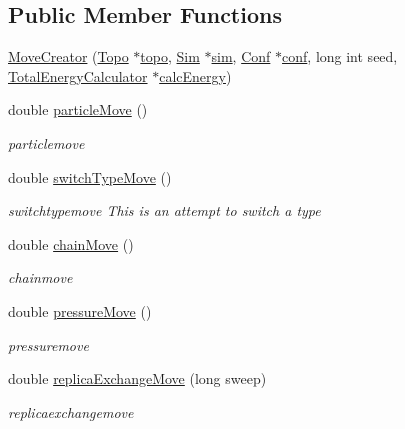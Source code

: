 \subsection*{Public Member Functions}
\begin{DoxyCompactItemize}
\item 
\hyperlink{class_move_creator_aa35bf0832806de7d919a7eed7fb963a5}{Move\+Creator} (\hyperlink{struct_topo}{Topo} $\ast$\hyperlink{class_move_creator_a34a03c3300543b9db3f7b03bb77027d3}{topo}, \hyperlink{struct_sim}{Sim} $\ast$\hyperlink{class_move_creator_a75cae5ea1a390a8f3dc20e8870576404}{sim}, \hyperlink{class_conf}{Conf} $\ast$\hyperlink{class_move_creator_ab8854d02b8ca0b270709909e2ed1fb27}{conf}, long int seed, \hyperlink{class_total_energy_calculator}{Total\+Energy\+Calculator} $\ast$\hyperlink{class_move_creator_ac60e9b10f19291781e8e3b668044aef9}{calc\+Energy})
\item 
double \hyperlink{class_move_creator_aad8458338233ca1f35638cc9a6823db0}{particle\+Move} ()
\begin{DoxyCompactList}\small\item\em particlemove \end{DoxyCompactList}\item 
double \hyperlink{class_move_creator_a883ac539f14fff01eb0953866a6acc65}{switch\+Type\+Move} ()
\begin{DoxyCompactList}\small\item\em switchtypemove This is an attempt to switch a type \end{DoxyCompactList}\item 
double \hyperlink{class_move_creator_a5daa7c16f81522c9601e340763929a62}{chain\+Move} ()
\begin{DoxyCompactList}\small\item\em chainmove \end{DoxyCompactList}\item 
double \hyperlink{class_move_creator_aad927096be462aa2372becf7fcadde60}{pressure\+Move} ()
\begin{DoxyCompactList}\small\item\em pressuremove \end{DoxyCompactList}\item 
double \hyperlink{class_move_creator_a492daeed703811ac4455ed1a4b6fdd76}{replica\+Exchange\+Move} (long sweep)
\begin{DoxyCompactList}\small\item\em replicaexchangemove \end{DoxyCompactList}\item 

\end{DoxyCompactItemize}

